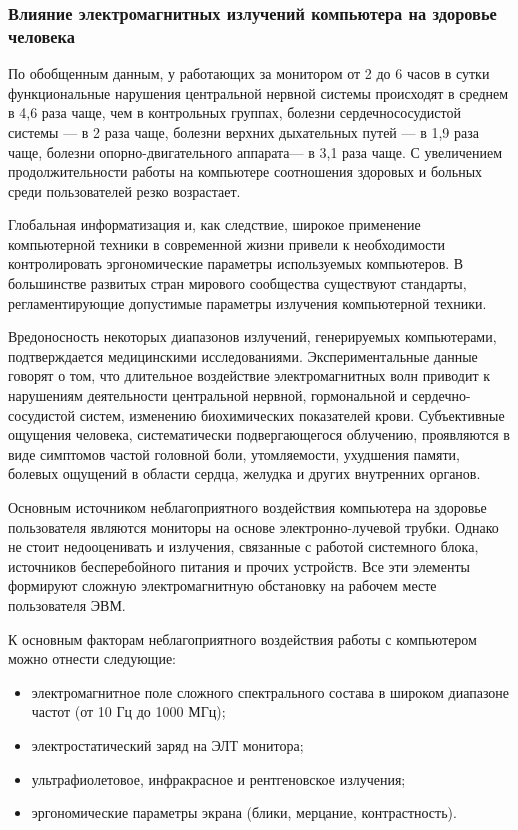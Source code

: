 \subsubsection{Влияние электромагнитных излучений компьютера на здоровье человека}

По обобщенным данным, у работающих за монитором от 2 до 6 часов в сутки функциональные нарушения центральной нервной системы происходят в среднем в 4,6 раза чаще, чем в контрольных группах, болезни сердечнососудистой системы --- в 2 раза чаще, болезни верхних дыхательных путей --- в 1,9 раза чаще, болезни опорно-двигательного аппарата--- в 3,1 раза чаще.
С увеличением продолжительности работы на компьютере соотношения здоровых и больных среди пользователей резко возрастает.

Глобальная информатизация и, как следствие, широкое применение компьютерной техники в современной жизни привели к необходимости контролировать эргономические параметры используемых компьютеров.
В большинстве развитых стран мирового сообщества существуют стандарты, регламентирующие допустимые параметры излучения компьютерной техники.

Вредоносность некоторых диапазонов излучений, генерируемых компьютерами, подтверждается медицинскими исследованиями.
Экспериментальные данные говорят о том, что длительное воздействие электромагнитных волн приводит к нарушениям деятельности центральной нервной, гормональной и сердечно-сосудистой систем, изменению биохимических показателей крови.
Субъективные ощущения человека, систематически подвергающегося облучению, проявляются в виде симптомов частой головной боли, утомляемости, ухудшения памяти, болевых ощущений в области сердца, желудка и других внутренних органов.

Основным источником неблагоприятного воздействия компьютера на здоровье пользователя являются мониторы на основе электронно-лучевой трубки.
Однако не стоит недооценивать и излучения, связанные с работой системного блока, источников бесперебойного питания и прочих устройств.
Все эти элементы формируют сложную электромагнитную обстановку на рабочем месте пользователя ЭВМ.

К основным факторам неблагоприятного воздействия работы с компьютером можно отнести следующие:
\begin{itemize}
  \item электромагнитное поле сложного спектрального состава в широком диапазоне частот (от 10 Гц до 1000 МГц);
  \item электростатический заряд на ЭЛТ монитора;
  \item ультрафиолетовое, инфракрасное и рентгеновское излучения;
  \item эргономические параметры экрана (блики, мерцание, контрастность).
\end{itemize}

